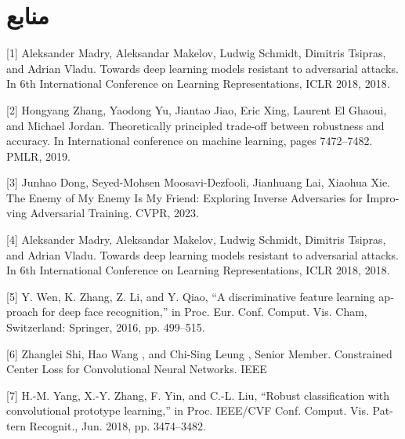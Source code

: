 \documentclass{article}
\begin{document}
\pagebreak
\section*{منابع}
\begin{latin}


[1] Aleksander Madry, Aleksandar Makelov, Ludwig Schmidt, Dimitris Tsipras, and Adrian Vladu. Towards deep learning models resistant to adversarial attacks. In 6th International
Conference on Learning Representations, ICLR 2018, 2018.

[2] Hongyang Zhang, Yaodong Yu, Jiantao Jiao, Eric Xing, Laurent El Ghaoui, and Michael Jordan. Theoretically principled trade-off between robustness and accuracy. In International
conference on machine learning, pages 7472–7482. PMLR, 2019.

[3] Junhao Dong, Seyed-Mohsen Moosavi-Dezfooli, Jianhuang Lai, Xiaohua Xie. The Enemy of My Enemy Is My Friend: Exploring Inverse Adversaries for Improving Adversarial Training. CVPR, 2023.

[4] Aleksander Madry, Aleksandar Makelov, Ludwig Schmidt, Dimitris Tsipras, and Adrian Vladu. Towards deep learning models resistant to adversarial attacks. In 6th International
Conference on Learning Representations, ICLR 2018, 2018.

[5] Y. Wen, K. Zhang, Z. Li, and Y. Qiao, “A discriminative feature learning approach for deep face recognition,” in Proc. Eur. Conf. Comput. Vis. Cham, Switzerland: Springer, 2016, pp. 499–515.

[6] Zhanglei Shi, Hao Wang , and Chi-Sing Leung , Senior Member. Constrained Center Loss for Convolutional Neural Networks. IEEE

[7] H.-M. Yang, X.-Y. Zhang, F. Yin, and C.-L. Liu, “Robust classification with convolutional prototype learning,” in Proc. IEEE/CVF Conf. Comput. Vis. Pattern Recognit., Jun. 2018, pp. 3474–3482.


\end{latin}
\end{document}
